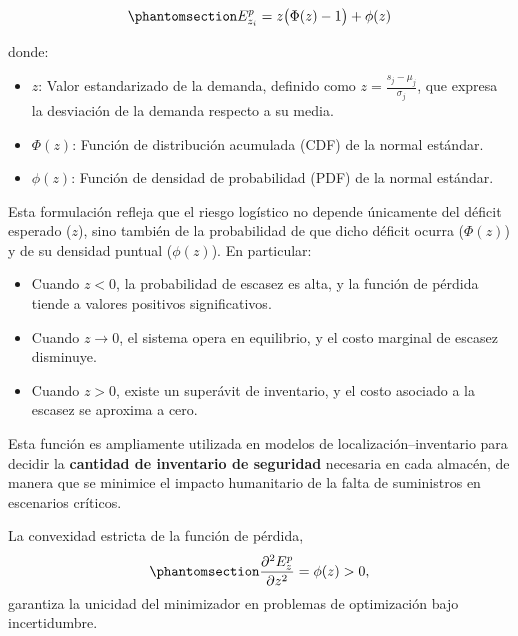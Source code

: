 \documentclass[
  spanish,
  us-letterpaper,
]{scrreprt}
\providecommand{\tightlist}{%
  \setlength{\itemsep}{0pt}\setlength{\parskip}{0pt}}
\numberwithin{equation}{chapter} %
\begin{document}
\begin{equation}\phantomsection\label{eq-PBHE_completa}{
E_{z_i}^p = z \big( \Phi(z)-1 \big) + \phi(z) 
}\end{equation}

donde:

\begin{itemize}
\tightlist
\item
  \(z\): Valor estandarizado de la demanda, definido como
  \(\displaystyle z = \frac{s_j - \mu_j}{\sigma_j}\), que expresa la
  desviación de la demanda respecto a su media.\\
\item
  \(\Phi(z)\): Función de distribución acumulada (CDF) de la normal
  estándar.\\
\item
  \(\phi(z)\): Función de densidad de probabilidad (PDF) de la normal
  estándar.
\end{itemize}

Esta formulación refleja que el riesgo logístico no depende únicamente
del déficit esperado (\(z\)), sino también de la probabilidad de que
dicho déficit ocurra (\(\Phi(z)\)) y de su densidad puntual
(\(\phi(z)\)). En particular:

\begin{itemize}
\tightlist
\item
  Cuando \(z < 0\), la probabilidad de escasez es alta, y la función de
  pérdida tiende a valores positivos significativos.\\
\item
  Cuando \(z \to 0\), el sistema opera en equilibrio, y el costo
  marginal de escasez disminuye.\\
\item
  Cuando \(z > 0\), existe un superávit de inventario, y el costo
  asociado a la escasez se aproxima a cero.
\end{itemize}

Esta función es ampliamente utilizada en modelos de
localización--inventario para decidir la \textbf{cantidad de inventario
de seguridad} necesaria en cada almacén, de manera que se minimice el
impacto humanitario de la falta de suministros en escenarios críticos.

La convexidad estricta de la función de pérdida,
\begin{equation}\phantomsection\label{eq-PBHE_completa}{
\frac{\partial^2 E_z^p}{\partial z^2} = \phi(z) > 0,
}\end{equation} garantiza la unicidad del minimizador en problemas de
optimización bajo incertidumbre.
\end{document}
